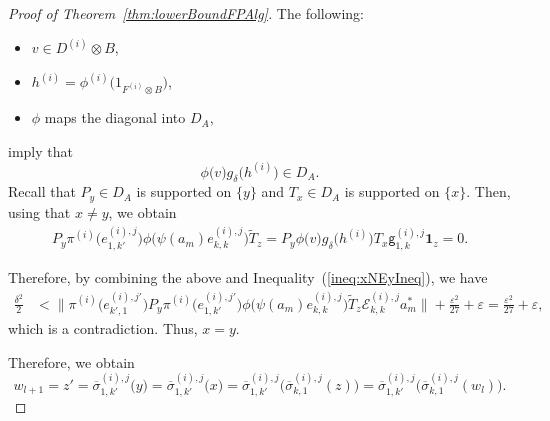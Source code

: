 \documentclass[a4paper]{amsart}
\numberwithin{equation}{section}
\newcommand{\Ecal}{\mathcal{E}}
\newcommand{\e}{\varepsilon}
\newcommand{\indF}{\mathbf{1}}
\newcommand{\prn}[1]{{(#1)}}
\newcommand{\normBig}[1]{{\Big\lVert #1 \Big \rVert}}
\newcommand{\unMatImg}[3]{{\Ecal_{#3}^{(#1), #2}}}
\newcommand{\gUnMatImg}[3]{{ \mathsf{g}_{#3}^{(#1), #2}}}
\theoremstyle{plain}
\theoremstyle{indented}
\numberwithin{equation}{section}
\theoremstyle{definition}
\theoremstyle{remark}
\theoremstyle{plain}
\theoremstyle{definition}
\begin{document}
\begin{proof}[Proof of Theorem~\ref{thm:lowerBoundFPAlg}]
        The following:
        \begin{itemize}
            \item ${v \in D^{\prn{i}} \otimes B}$,
            \item ${h^{(i)} = \phi^{(i)} \big( 1_{F^{(i)} \otimes B} \big)}$,
            \item $\phi$ maps the diagonal into $D_A$,
        \end{itemize}
        imply that 
         \[{{\phi}\big( v \big)   g_\delta\big(h^{(i)}\big) \in D_A}.\]
        Recall that ${P_y \in D_A}$ is supported on $\{y\}$ and ${T_x \in D_A}$ is supported on $\{x\}$. 
        Then, using that ${x \ne y}$, we obtain
        \begin{align*}
            P_y \pi^{(i)}\big(e^{\prn{i},j}_{1,k'} \big) {\phi}\big({\psi}(a_m) e_{k,k}^{(i),j} \big)   \widetilde{T}_{z}
            = P_y {\phi}\big( v \big)   g_\delta\big(h^{(i)}\big) T_x \gUnMatImg{i}{j}{1,k}  \indF_{z} = 0.
        \end{align*}
          
         Therefore, by combining the above and
         Inequality~(\ref{ineq:xNEyIneq}), we have
         \begin{align*}
          \frac{\delta^2}{2}
           & <  \normBig{\pi^{(i)}\big(e^{\prn{i},j'}_{k',1} \big)  P_y \pi^{(i)}\big(e^{\prn{i},j'}_{1,k'} \big) {\phi}\big({\psi}(a_m) e_{k,k}^{(i),j} \big)   \widetilde{T}_{z} \unMatImg{i}{j}{k,k} a_m^\ast} + \frac{\e^2}{27} +\e
           = \frac{\e^2}{27} +\e,
        \end{align*}
        which is a contradiction. 
        Thus, $x=y$.
  
         Therefore, we obtain
         \begin{equation} \label{eq:LowerBoundProof1}
                w_{l+1} = z' 
         ={\overline{\sigma}_{1,k'}^{(i),j}}\big(y \big)
        = {\overline{\sigma}_{1,k'}^{(i),j}}\big(x \big)
        = {\overline{\sigma}_{1,k'}^{(i),j}}\big({{\overline{\sigma}}_{k,1}^{(i),j}}(z) \big)
        = {\overline{\sigma}_{1,k'}^{(i),j}}\big({{\overline{\sigma}}_{k,1}^{(i),j}}(w_l) \big). 
         \end{equation}


\end{proof}
\end{document}
